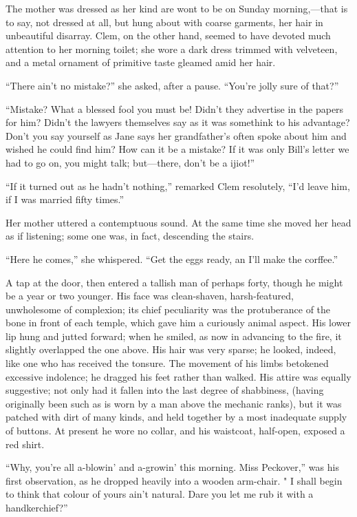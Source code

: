 The mother was dressed as her kind are wont to be on Sunday
morning,---that is to say, not dressed at all, but hung about with
coarse garments, her hair in unbeautiful disarray. Clem, on the other
hand, seemed to have devoted much attention to her morning toilet; she
wore a dark dress trimmed with {}velveteen, and a metal ornament of
primitive taste gleamed amid her hair.

``There ain't no mistake?'' she asked, after a pause. ``You're jolly
sure of that?''

``Mistake? What a blessed fool you must be! Didn't they advertise in the
papers for him? Didn't the lawyers themselves say as it was somethink to
his advantage? Don't you say yourself as Jane says her grandfather's
often spoke about him and wished he could find him? How can it be a
mistake? If it was only Bill's letter we had to go on, you might talk;
but---there, don't be a ijiot!''

``If it turned out as he hadn't nothing,'' remarked Clem resolutely,
``I'd leave him, if I was married fifty times.''

Her mother uttered a contemptuous sound. At the same time she moved her
head as if listening; some one was, in fact, descending the stairs.

``Here he comes,'' she whispered. ``Get the eggs ready, an I'll make the
corffee.''

A tap at the door, then entered a tallish {}man of perhaps forty, though
he might be a year or two younger. His face was clean-shaven,
harsh-featured, unwholesome of complexion; its chief peculiarity was the
protuberance of the bone in front of each temple, which gave him a
curiously animal aspect. His lower lip hung and jutted forward; when he
smiled, as now in advancing to the fire, it slightly overlapped the one
above. His hair was very sparse; he looked, indeed, like one who has
received the tonsure. The movement of his limbs betokened excessive
indolence; he dragged his feet rather than walked. His attire was
equally suggestive; not only had it fallen into the last degree of
shabbiness, (having originally been such as is worn by a man above the
mechanic ranks), but it was patched with dirt of many kinds, and held
together by a most inadequate supply of buttons. At present he wore no
collar, and his waistcoat, half-open, exposed a red shirt.

``Why, you're all a-blowin' and a-growin' this morning. Miss Peckover,''
was his first observation, as he dropped heavily into a {}wooden
arm-chair. " I shall begin to think that colour of yours ain't natural.
Dare you let me rub it with a handkerchief?''

